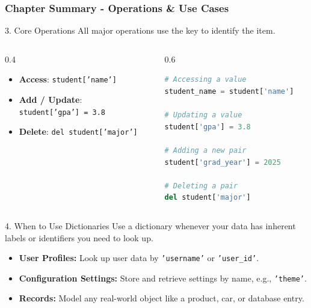 \documentclass{beamer}
\begin{document}
\begin{frame}[fragile]
    \frametitle{Chapter Summary - Operations \& Use Cases}
    \begin{block}{3. Core Operations}
        All major operations use the key to identify the item.
        \begin{columns}[T]
            \begin{column}{0.4\textwidth}
                \begin{itemize}
                    \item \textbf{Access}: \texttt{student['name']}
                    \item \textbf{Add / Update}: \\ \texttt{student['gpa'] = 3.8}
                    \item \textbf{Delete}: \texttt{del student['major']}
                \end{itemize}
            \end{column}
            \begin{column}{0.6\textwidth}
                \begin{lstlisting}[language=Python]
# Accessing a value
student_name = student['name']

# Updating a value
student['gpa'] = 3.8

# Adding a new pair
student['grad_year'] = 2025

# Deleting a pair
del student['major']
                \end{lstlisting}
            \end{column}
        \end{columns}
    \end{block}

    \begin{block}{4. When to Use Dictionaries}
        Use a dictionary whenever your data has inherent labels or identifiers you need to look up.
        \begin{itemize}
            \item \textbf{User Profiles:} Look up user data by \texttt{'username'} or \texttt{'user\_id'}.
            \item \textbf{Configuration Settings:} Store and retrieve settings by name, e.g., \texttt{'theme'}.
            \item \textbf{Records:} Model any real-world object like a product, car, or database entry.
        \end{itemize}
    \end{block}
\end{frame}
\end{document}
